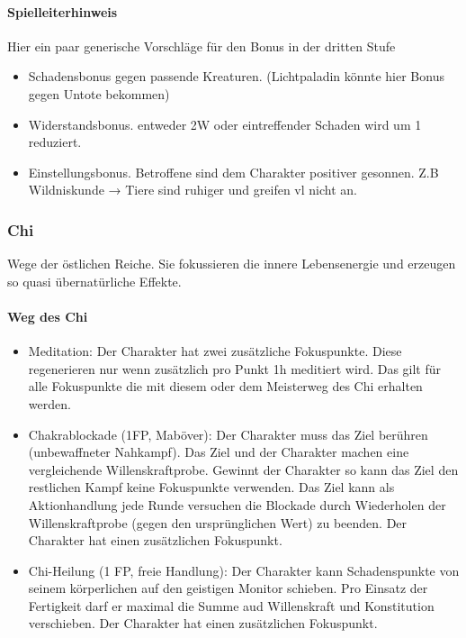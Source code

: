 \documentclass{article}
\begin{document}
\begin{mdframed}[hidealllines=true, backgroundcolor=black!10]
\paragraph{Spielleiterhinweis}

Hier ein paar generische Vorschläge für den Bonus in der dritten Stufe

\begin{itemize}
\item Schadensbonus gegen passende Kreaturen. (Lichtpaladin könnte hier Bonus gegen Untote bekommen)
\item Widerstandsbonus. entweder 2W oder eintreffender Schaden wird um 1 reduziert.
\item Einstellungsbonus. Betroffene sind dem Charakter positiver gesonnen. Z.B Wildniskunde → Tiere sind ruhiger und greifen vl nicht an.
\end{itemize}

\end{mdframed}
\subsubsection{Chi}

Wege der östlichen Reiche. Sie fokussieren die innere Lebensenergie und erzeugen so quasi übernatürliche Effekte.

\paragraph{Weg des Chi}

\begin{itemize}
\item Meditation: Der Charakter hat zwei zusätzliche Fokuspunkte. Diese regenerieren nur wenn zusätzlich pro Punkt 1h meditiert wird. Das gilt für alle Fokuspunkte die mit diesem oder dem Meisterweg des Chi erhalten werden.
\item Chakrablockade (1FP, Maböver): Der Charakter muss das Ziel berühren (unbewaffneter Nahkampf). Das Ziel und der Charakter machen eine vergleichende Willenskraftprobe. Gewinnt der Charakter so kann das Ziel den restlichen Kampf keine Fokuspunkte verwenden. Das Ziel kann als Aktionhandlung jede Runde versuchen die Blockade durch Wiederholen der Willenskraftprobe (gegen den ursprünglichen Wert) zu beenden. Der Charakter hat einen zusätzlichen Fokuspunkt.
\item Chi-Heilung (1 FP, freie Handlung): Der Charakter kann Schadenspunkte von seinem körperlichen auf den geistigen Monitor schieben. Pro Einsatz der Fertigkeit darf er maximal die Summe aud Willenskraft und Konstitution verschieben. Der Charakter hat einen zusätzlichen Fokuspunkt.
\end{itemize}
\end{document}
